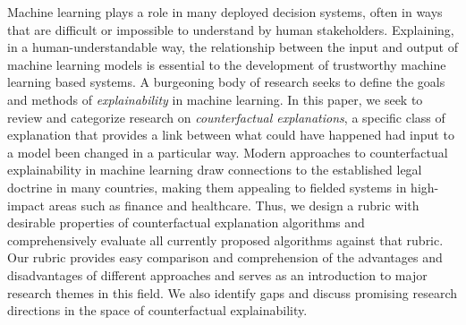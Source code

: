 Machine learning plays a role in many deployed decision systems, often in ways that are difficult or impossible to understand by human stakeholders.  Explaining, in a human-understandable way, the relationship between the input and output of machine learning models is essential to the development of trustworthy machine learning based systems.  A burgeoning body of research seeks to define the goals and methods of \emph{explainability} in machine learning.  In this paper, we seek to review and categorize research on \emph{counterfactual explanations}, a specific class of explanation that provides a link between what could have happened had input to a model been changed in a particular way.  Modern approaches to counterfactual explainability in machine learning draw connections to the established legal doctrine in many countries, making them appealing to fielded systems in high-impact areas such as finance and healthcare.  Thus, we design a rubric with desirable properties of counterfactual explanation algorithms and comprehensively evaluate all currently proposed algorithms against that rubric.  Our rubric provides easy comparison and comprehension of the advantages and disadvantages of different approaches and serves as an introduction to major research themes in this field.  We also identify gaps and discuss promising research directions in the space of counterfactual explainability. 

